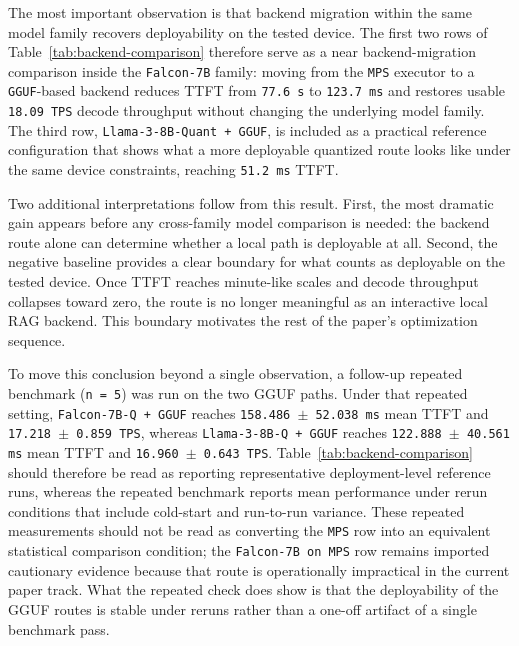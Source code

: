 \documentclass[10pt,twocolumn]{article}
\begin{document}


The most important observation is that backend migration within the same model family recovers deployability on the tested device. The first two rows of Table~\ref{tab:backend-comparison} therefore serve as a near backend-migration comparison inside the \texttt{Falcon-7B} family: moving from the \texttt{MPS} executor to a \texttt{GGUF}-based backend reduces TTFT from \texttt{77.6 s} to \texttt{123.7 ms} and restores usable \texttt{18.09 TPS} decode throughput without changing the underlying model family. The third row, \texttt{Llama-3-8B-Quant + GGUF}, is included as a practical reference configuration that shows what a more deployable quantized route looks like under the same device constraints, reaching \texttt{51.2 ms} TTFT.

Two additional interpretations follow from this result. First, the most dramatic gain appears before any cross-family model comparison is needed: the backend route alone can determine whether a local path is deployable at all. Second, the negative baseline provides a clear boundary for what counts as deployable on the tested device. Once TTFT reaches minute-like scales and decode throughput collapses toward zero, the route is no longer meaningful as an interactive local RAG backend. This boundary motivates the rest of the paper's optimization sequence.

To move this conclusion beyond a single observation, a follow-up repeated benchmark (\texttt{n = 5}) was run on the two GGUF paths. Under that repeated setting, \texttt{Falcon-7B-Q + GGUF} reaches \texttt{158.486 $\pm$ 52.038 ms} mean TTFT and \texttt{17.218 $\pm$ 0.859 TPS}, whereas \texttt{Llama-3-8B-Q + GGUF} reaches \texttt{122.888 $\pm$ 40.561 ms} mean TTFT and \texttt{16.960 $\pm$ 0.643 TPS}. Table~\ref{tab:backend-comparison} should therefore be read as reporting representative deployment-level reference runs, whereas the repeated benchmark reports mean performance under rerun conditions that include cold-start and run-to-run variance. These repeated measurements should not be read as converting the \texttt{MPS} row into an equivalent statistical comparison condition; the \texttt{Falcon-7B on MPS} row remains imported cautionary evidence because that route is operationally impractical in the current paper track. What the repeated check does show is that the deployability of the GGUF routes is stable under reruns rather than a one-off artifact of a single benchmark pass.
\end{document}
